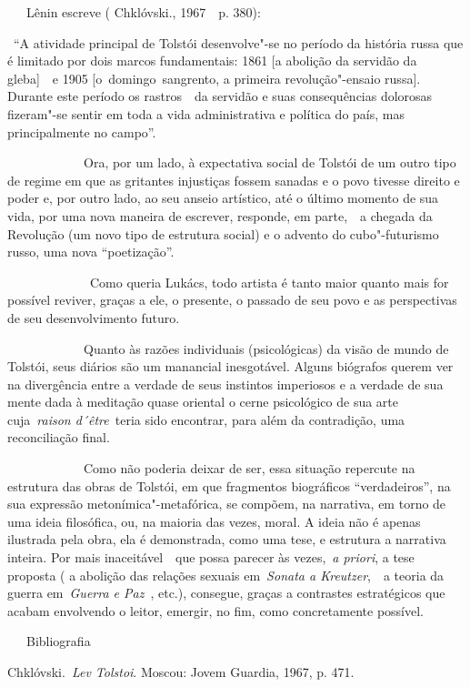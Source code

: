 ~~~Lênin escreve ( Chklóvski., 1967~~p. 380):

~``A atividade principal de Tolstói desenvolve"-se no período da história
russa que é limitado por dois marcos fundamentais: 1861 {[}a abolição da
servidão da gleba{]}~~e 1905 {[}o~domingo~sangrento, a primeira
revolução"-ensaio russa{]}. Durante este período os rastros~~da servidão
e suas consequências dolorosas fizeram"-se sentir em toda a vida
administrativa e política do país, mas principalmente no campo''.

~~~~~~~~~~~~Ora, por um lado, à expectativa social de Tolstói de um
outro tipo de regime em que as gritantes injustiças fossem sanadas e o
povo tivesse direito e poder e, por outro lado, ao seu anseio artístico,
até o último momento de sua vida, por uma nova maneira de escrever,
responde, em parte,~~a chegada da Revolução (um novo tipo de estrutura
social) e o advento do cubo"-futurismo russo, uma nova ``poetização''.

~~~~~~~~~~~~~Como queria Lukács, todo artista é tanto maior quanto mais
for possível reviver, graças a ele, o presente, o passado de seu povo e
as perspectivas de seu desenvolvimento futuro.

~~~~~~~~~~~~Quanto às razões individuais (psicológicas) da visão de
mundo de Tolstói, seus diários são um manancial inesgotável. Alguns
biógrafos querem ver na divergência entre a verdade de seus instintos
imperiosos e a verdade de sua mente dada à meditação quase oriental o
cerne psicológico de sua arte cuja~\emph{{raison d´être}}~teria sido
encontrar, para além da contradição, uma reconciliação final.

~~~~~~~~~~~~Como não poderia deixar de ser, essa situação repercute na
estrutura das obras de Tolstói, em que fragmentos biográficos
``verdadeiros'', na sua expressão metonímica"-metafórica, se compõem, na
narrativa, em torno de uma ideia filosófica, ou, na maioria das vezes,
moral. A ideia não é apenas ilustrada pela obra, ela é demonstrada, como
uma tese, e estrutura a narrativa inteira. Por mais inaceitável~~que
possa parecer às vezes,~\emph{a priori}, a tese proposta ( a abolição
das relações sexuais em~\emph{Sonata a Kreutzer},~~a teoria da guerra
em~\emph{Guerra e Paz}~, etc.), consegue, graças a contrastes
estratégicos que acabam envolvendo o leitor, emergir, no fim, como
concretamente possível.

~~~Bibliografia

 Chklóvski.~\emph{Lev Tolstoi}. Moscou: Jovem Guardia, 1967, p. 471.

